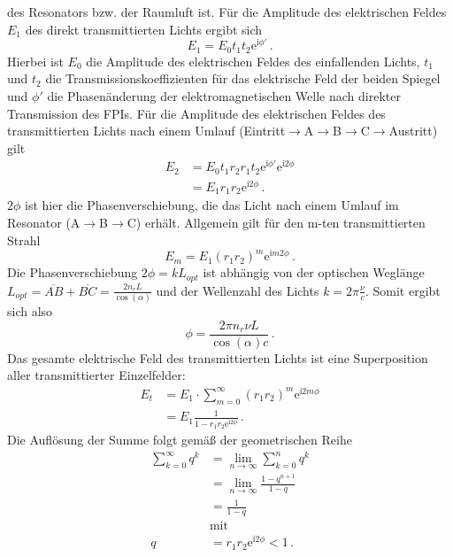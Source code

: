 des Resonators bzw. der Raumluft ist. Für die Amplitude des elektrischen Feldes
$E_1$ des direkt transmittierten Lichts ergibt sich
\begin{equation}\label{eq:FPI_E1}
	E_1=E_0t_1t_2\mathrm{e}^{\mathrm{i}\phi'}\,.
\end{equation}
Hierbei ist $E_0$ die Amplitude des elektrischen Feldes des einfallenden Lichts,
$t_1$ und $t_2$ die Transmissionskoeffizienten für das elektrische Feld
der beiden Spiegel und $\phi'$ die Phasenänderung der elektromagnetischen Welle
nach direkter Transmission des FPIs. Für die Amplitude des elektrischen Feldes des
transmittierten Lichts nach einem Umlauf
(Eintritt$\rightarrow$A$\rightarrow$B$\rightarrow$C$\rightarrow$Austritt) gilt
\begin{equation}\label{eq:FPI_E2}
	\begin{split}
		E_2
		&=E_0t_1r_2r_1t_2\mathrm{e}^{\mathrm{i}\phi'}\mathrm{e}^{\mathrm{i}2\phi}\\
		&=E_1r_1r_2\mathrm{e}^{\mathrm{i}2\phi}\,.
	\end{split}
\end{equation}
$2\phi$ ist hier die Phasenverschiebung, die das Licht nach einem Umlauf im
Resonator (A$\rightarrow$B$\rightarrow$C) erhält. Allgemein gilt für den m-ten
transmittierten Strahl
\begin{equation}\label{eq:FPI_Em}
	E_m=E_1(r_1r_2)^m\mathrm{e}^{\mathrm{i}m2\phi}\,.
\end{equation}
Die Phasenverschiebung $2\phi=kL_{opt}$ ist abhängig von der optischen Weglänge
$L_{opt}=\overline{AB}+\overline{BC}=\frac{2n_rL}{\cos{(\alpha)}}$ und der Wellenzahl des
Lichts $k=2\pi\frac{\nu}{c}$. Somit ergibt sich also
\begin{equation}\label{eq:FPI_phase}
	\phi=\frac{2\pi n_r\nu L}{\cos{(\alpha)}c}\,.
\end{equation}
Das gesamte elektrische Feld des transmittierten Lichts ist eine Superposition
aller transmittierter Einzelfelder:
\begin{equation}\label{eq:FPI_Et}
	\begin{split}
		E_t
		&=E_1\cdot\sum\limits_{m=0}^\infty(r_1r_2)^m\mathrm{e}^{\mathrm{i}2m\phi}\\
		&=E_1\frac{1}{1-r_1r_2\mathrm{e}^{\mathrm{i}2\phi}}\,.
	\end{split}
\end{equation}
Die Auflösung der Summe folgt gemäß der geometrischen Reihe
\begin{equation}\label{eq:geometrsiche_summe}
	\begin{split}
		\sum_{k=0}^{\infty}q^k &=\lim_{n\to\infty}\sum_{k=0}^{n}q^k\\
		&=\lim_{n\to\infty}\frac{1-q^{n+1}}{1-q}\\
		&=\frac{1}{1-q}\\
		&\text{mit}\\
		q&=r_1r_2\mathrm{e}^{\mathrm{i}2\phi}<1\,.
	\end{split}
\end{equation}
